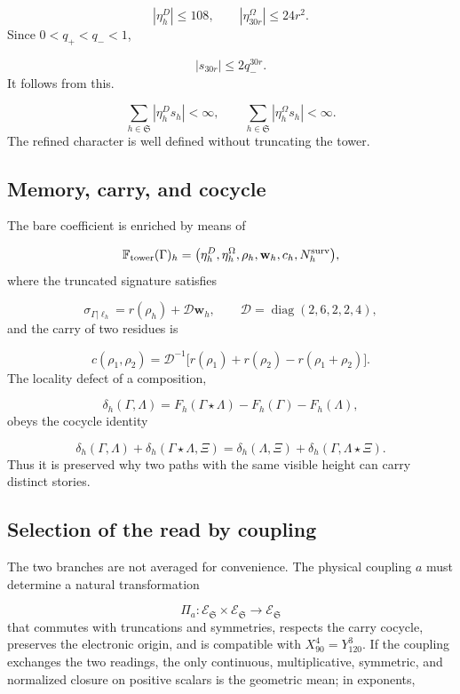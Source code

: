 \[
 |\eta_h^D|\le108,\qquad
 |\eta_{30r}^{\Omega}|\le24r^2.
\]
Since \(0<q_+<q_-<1\),

\[
 |s_{30r}|\le2q_-^{30r}.
\]
It follows from this.

\[
 \sum_{h\in\mathfrak S}|\eta_h^D s_h|<\infty,
 \qquad
 \sum_{h\in\mathfrak S}|\eta_h^\Omega s_h|<\infty.
\]
The refined character is well defined without truncating the tower.

\subsection{Memory, carry, and cocycle}
The bare coefficient is enriched by means of

\[
 \mathbb F_{\rm tower}(\Gamma)_h
 =\bigl(\eta_h^D,\eta_h^\Omega,\rho_h,
 \mathbf w_h,c_h,N_h^{\rm surv}\bigr),
\]
where the truncated signature satisfies

\[
 \sigma_{\Gamma|\ell_h}
 =r(\rho_h)+\mathcal D\mathbf w_h,
 \qquad
 \mathcal D=\operatorname{diag}(2,6,2,2,4),
\]
and the carry of two residues is

\[
 c(\rho_1,\rho_2)=
 \mathcal D^{-1}
 \bigl[r(\rho_1)+r(\rho_2)-r(\rho_1+\rho_2)\bigr].
\]
The locality defect of a composition,

\[
 \delta_h(\Gamma,\Lambda)=
 F_h(\Gamma\star\Lambda)-F_h(\Gamma)-F_h(\Lambda),
\]
obeys the cocycle identity

\[
 \delta_h(\Gamma,\Lambda)
 +\delta_h(\Gamma\star\Lambda,\Xi)
 =\delta_h(\Lambda,\Xi)
 +\delta_h(\Gamma,\Lambda\star\Xi).
\]
Thus it is preserved why two paths with the same visible height can carry distinct stories.

\subsection{Selection of the read by coupling}
The two branches are not averaged for convenience. The physical coupling \(a\) must determine a natural transformation

\[
 \Pi_a:
 \mathcal E_{\mathfrak S}\times\mathcal E_{\mathfrak S}
 \longrightarrow\mathcal E_{\mathfrak S}
\]
that commutes with truncations and symmetries, respects the carry cocycle, preserves the electronic origin, and is compatible with \(X_{90}^{4}=Y_{120}^{3}\). If the coupling exchanges the two readings, the only continuous, multiplicative, symmetric, and normalized closure on positive scalars is the geometric mean; in exponents,

